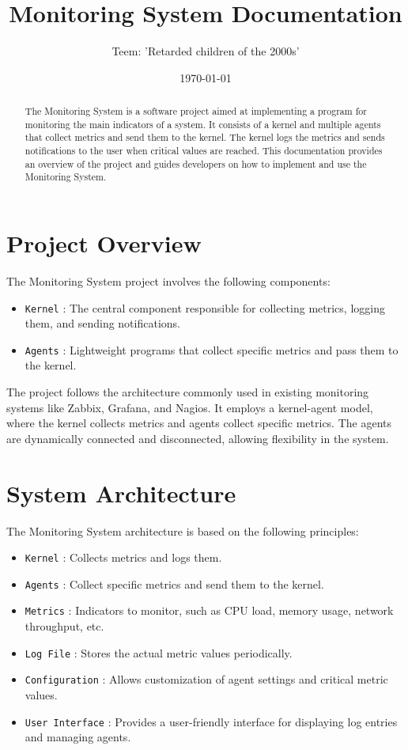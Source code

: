 \documentclass[12pt, a4paper]{article}
\title{Monitoring System Documentation}
\author{Teem: 'Retarded children of the 2000s'}
\date{\today}
\begin{document}
\maketitle

\tableofcontents

\newpage

\begin{abstract}
The Monitoring System is a software project aimed at implementing a program for monitoring the main indicators of a system. It consists of a kernel and multiple agents that collect metrics and send them to the kernel. The kernel logs the metrics and sends notifications to the user when critical values are reached. This documentation provides an overview of the project and guides developers on how to implement and use the Monitoring System.
\end{abstract}

\section{Project Overview}

The Monitoring System project involves the following components:
\begin{itemize}
    \item \texttt{Kernel} : The central component responsible for collecting metrics, logging them, and sending notifications.
    \item \texttt{Agents} : Lightweight programs that collect specific metrics and pass them to the kernel.
\end{itemize}

{\fontsize{10}{10}\selectfont The project follows the architecture commonly used in existing monitoring systems like Zabbix, Grafana, and Nagios. It employs a kernel-agent model, where the kernel collects metrics and agents collect specific metrics. The agents are dynamically connected and disconnected, allowing flexibility in the system.}

\section{System Architecture}

The Monitoring System architecture is based on the following principles:
\begin{itemize}
    \item \texttt{Kernel} : Collects metrics and logs them.
    \item \texttt{Agents} : Collect specific metrics and send them to the kernel.
    \item \texttt{Metrics} : Indicators to monitor, such as CPU load, memory usage, network throughput, etc.
    \item \texttt{Log File} : Stores the actual metric values periodically.
    \item \texttt{Configuration} : Allows customization of agent settings and critical metric values.
    \item \texttt{User Interface} : Provides a user-friendly interface for displaying log entries and managing agents.
\end{itemize}
\end{document}
